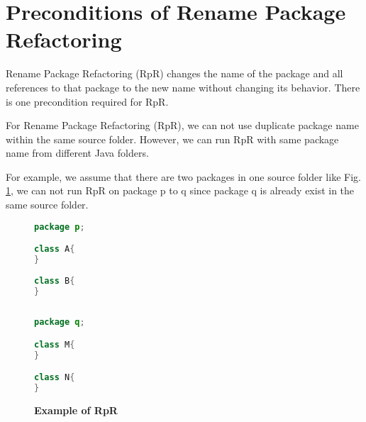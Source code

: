 \section{\textbf{Preconditions of Rename Package Refactoring}}
Rename Package Refactoring (RpR) changes the name of the package and all references to that package to the new name without changing its behavior. There is one precondition required for RpR.

For Rename Package Refactoring (RpR), we can not use duplicate package name within the same source folder. However, we can run RpR with same package name from different Java folders.

For example, we assume that there are two packages in one source folder like Fig. \ref{fig:RpR}, we can not run RpR on package p to q since package q is already exist in the same source folder. 

\begin{figure}[th]
\centering
\begin{minipage}[t]{0.45\linewidth}
\begin{lstlisting}[language=java, basicstyle=\scriptsize\ttfamily,frame=single]
package p;

class A{
}
	
class B{
}
 
\end{lstlisting}
\end{minipage}
\hfill
\begin{minipage}[t]{0.45\linewidth}
\begin{lstlisting}[language=java, basicstyle=\scriptsize\ttfamily,frame=single]
package q;

class M{
}	

class N{
}


\end{lstlisting}
\end{minipage}
\caption{\textbf{Example of RpR}}
\label{fig:RpR}
\end{figure}